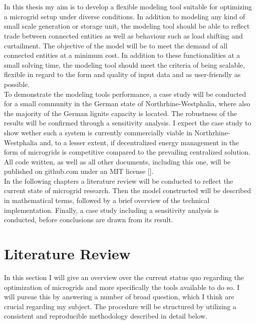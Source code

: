 \documentclass[
	11pt,								%
	DIV10,								%
	a4paper,         					%
	oneside,							%
	headheight=20pt,					%
	footheight=20pt,					%
    parskip=full,						%
    listof=totoc,						%
	bibliography=totoc,					%
	index=totoc,						%
]{scrartcl}
\begin{document}
\\\\
In this thesis my aim is to develop a flexible modeling tool suitable for optimizing a microgrid setup under diverse conditions. In addition to modeling any kind of small scale generation or storage unit, the modeling tool should be able to reflect trade between connected entities as well as behaviour such as load shifting and curtailment. The objective of the model will be to meet the demand of all connected entities at a minimum cost. In addition to these functionalities at a small solving time, the modeling tool should meet the criteria of being scalable, flexible in regard to the form and quality of input data and as user-friendly as possible.\\
To demonstrate the modeling tools performance, a case study will be conducted for a small community in the German state of Northrhine-Westphalia, where also the majority of the German lignite capacity is located. The robustness of the results will be confirmed through a sensitivity analysis.
I expect the case study to show wether such a system is currently commercially viable in Northrhine-Westphalia and, to a lesser extent, if decentralized energy management in the form of microgrids is competitive compared to the prevailing centralized solution.
All code written, as well as all other documents, including this one, will be published on github.com under an MIT license [\cite{MITLicense2018}].
\\
In the following chapters a literature review will be conducted to reflect the current state of microgrid research. Then the model constructed will be described in mathematical terms, followed by a brief overview of the technical implementation. Finally, a case study including a sensitivity analysis is conducted, before conclusions are drawn from its result.

\newpage
{}	

\section{Literature Review}
In this section I will give an overview over the current status quo regarding the optimization of microgrids and more specifically the tools available to do so. I will pursue  this by answering a number of broad question, which I think are crucial regarding my subject. The procedure will be structured by utilizing a consistent and reproducible methodology described in detail below. 
\end{document}
